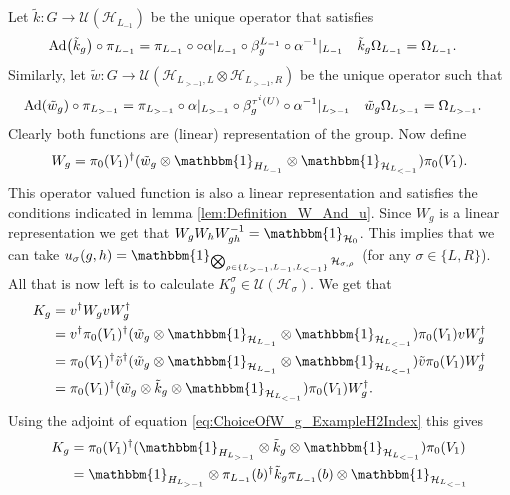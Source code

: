 \documentclass[12pt,a4paper,twoside]{article}
\let\originalleft\left
\let\originalright\right
\renewcommand{\left}{\mathopen{}\mathclose\bgroup\originalleft}
\renewcommand{\right}{\aftergroup\egroup\originalright}
\newcommand{\UU}{\mathcal U}
\newcommand{\HH}{\mathcal H}
\newcommand{\id}{\mathbbm{1}}
\newcommand{\Ad}[1]{\textrm{Ad}\left(#1\right)}
\theoremstyle{definition}
\numberwithin{equation}{section}
\begin{document}
Let $\tilde k:G\rightarrow \UU(\HH_{L_{-1}})$ be the unique operator that satisfies
\begin{align}
	\Ad{\tilde{k}_g}\circ\pi_{L_{-1}}&=\pi_{L_{-1}}\circ \circ\alpha|_{L_{-1}}\circ\beta_g^{L_{-1}}\circ \alpha^{-1}|_{L_{-1}}&\tilde k_g\Omega_{L_{-1}}&=\Omega_{L_{-1}}.
\end{align}
Similarly, let $\tilde{w}:G\rightarrow\UU(\HH_{L_{>-1},L}\otimes\HH_{L_{>-1},R})$ be the unique operator such that
\begin{align}
	\Ad{\tilde w_{g}}\circ\pi_{L_{>-1}}&=\pi_{L_{>-1}}\circ\alpha|_{L_{>-1}}\circ\beta_g^{\tau^{i}(U)}\circ \alpha^{-1}|_{L_{>-1}}&\tilde w_{g}\Omega_{L_{>-1}}&=\Omega_{L_{>-1}}.
\end{align}
Clearly both functions are (linear) representation of the group. Now define
\begin{equation}\label{eq:ChoiceOfW_g_ExampleH2Index}
	W_g=\pi_{0}(V_1)^{\dagger}(\tilde{w}_g\otimes\id_{H_{L_{-1}}}\otimes\id_{\HH_{L_{<-1}}}) \pi_{0}(V_1).
\end{equation}
This operator valued function is also a linear representation and satisfies the conditions indicated in lemma \ref{lem:Definition_W_And_u}. Since $W_g$ is a linear representation we get that $W_gW_hW_{gh}^{-1}=\id_{\HH_0}$. This implies that we can take $u_\sigma(g,h)=\id_{\bigotimes_{\rho\in\{L_{>-1},L_{-1},L_{<-1}\}}\HH_{\sigma,\rho}}$ (for any $\sigma\in\{L,R\}$). All that is now left is to calculate $K^\sigma_g\in\UU(\HH_\sigma)$. We get that
\begin{align}
	K_g&=v^\dagger W_g v W_g^\dagger\\
	&=v^\dagger \pi_{0}(V_1)^{\dagger}(\tilde{w}_g\otimes\id_{\HH_{L_{-1}}}\otimes\id_{\HH_{L_{<-1}}}) \pi_{0}(V_1) v W_g^\dagger\\
	&=\pi_{0}(V_1)^{\dagger}\tilde v^\dagger(\tilde{w}_g\otimes\id_{\HH_{L_{-1}}}\otimes\id_{\HH_{L_{<-1}}}) \tilde v \pi_{0}(V_1) W_g^\dagger\\
	&=\pi_{0}(V_1)^{\dagger}(\tilde{w}_g\otimes\tilde{k}_g\otimes\id_{\HH_{L_{<-1}}}) \pi_{0}(V_1) W_g^\dagger.
\end{align}
Using the adjoint of equation \eqref{eq:ChoiceOfW_g_ExampleH2Index} this gives
\begin{align}
	K_g&=\pi_{0}(V_1)^{\dagger}(\id_{H_{L_{>-1}}}\otimes \tilde k_g \otimes\id_{\HH_{L_{<-1}}}) \pi_{0}(V_1)\\
	&=\id_{H_{L_{>-1}}}\otimes \pi_{L_{-1}}(b)^\dagger \tilde k_g \pi_{L_{-1}}(b) \otimes\id_{\HH_{L_{<-1}}}
\end{align}
\end{document}
